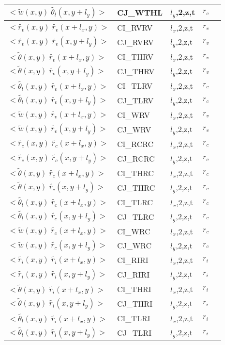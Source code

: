 \begin{center}
\begin{tabular}{||p{6cm}|>{\centering}p{2.5cm}|>{\centering}p{1.5cm}|>{\centering}p{0.5cm}|p{5cm }||}
\hline
$<\tilde{w}(x,y)\;\tilde{\theta_l}(x,y+l_y)>$ & CJ\_WTHL & $l_y$,2,z,t & $r_c$ & \\
\hline
$<\tilde{r_v}(x,y)\;\tilde{r_v}(x+l_x,y)>$ & CI\_RVRV & $l_x$,2,z,t & $r_v$ & \\
\hline
$<\tilde{r_v}(x,y)\;\tilde{r_v}(x,y+l_y)>$ & CJ\_RVRV & $l_y$,2,z,t & $r_v$ & \\
\hline
$<\tilde{\theta}(x,y)\;\tilde{r_v}(x+l_x,y)>$ & CI\_THRV & $l_x$,2,z,t & $r_v$ & \\
\hline
$<\tilde{\theta}(x,y)\;\tilde{r_v}(x,y+l_y)>$ & CJ\_THRV & $l_y$,2,z,t & $r_v$ & \\
\hline
$<\tilde{\theta_l}(x,y)\;\tilde{r_v}(x+l_x,y)>$ & CI\_TLRV & $l_x$,2,z,t & $r_c$ & \\
\hline
$<\tilde{\theta_l}(x,y)\;\tilde{r_v}(x,y+l_y)>$ & CJ\_TLRV & $l_y$,2,z,t & $r_c$ & \\
\hline
$<\tilde{w}(x,y)\;\tilde{r_v}(x+l_x,y)>$ & CI\_WRV & $l_x$,2,z,t & $r_v$ & \\
\hline
$<\tilde{w}(x,y)\;\tilde{r_v}(x,y+l_y)>$ & CJ\_WRV & $l_y$,2,z,t & $r_v$ & \\
\hline
$<\tilde{r_c}(x,y)\;\tilde{r_c}(x+l_x,y)>$ & CI\_RCRC & $l_x$,2,z,t & $r_c$ & \\
\hline
$<\tilde{r_c}(x,y)\;\tilde{r_c}(x,y+l_y)>$ & CJ\_RCRC & $l_y$,2,z,t & $r_c$ & \\
\hline
$<\tilde{\theta}(x,y)\;\tilde{r_c}(x+l_x,y)>$ & CI\_THRC & $l_x$,2,z,t & $r_c$ & \\
\hline
$<\tilde{\theta}(x,y)\;\tilde{r_c}(x,y+l_y)>$ & CJ\_THRC & $l_y$,2,z,t & $r_c$ & \\
\hline
$<\tilde{\theta_l}(x,y)\;\tilde{r_c}(x+l_x,y)>$ & CI\_TLRC & $l_x$,2,z,t & $r_c$ & \\
\hline
$<\tilde{\theta_l}(x,y)\;\tilde{r_c}(x,y+l_y)>$ & CJ\_TLRC & $l_y$,2,z,t & $r_c$ & \\
\hline
$<\tilde{w}(x,y)\;\tilde{r_c}(x+l_x,y)>$ & CI\_WRC & $l_x$,2,z,t & $r_c$ & \\
\hline
$<\tilde{w}(x,y)\;\tilde{r_c}(x,y+l_y)>$ & CJ\_WRC & $l_y$,2,z,t & $r_c$ & \\
\hline
$<\tilde{r_i}(x,y)\;\tilde{r_i}(x+l_x,y)>$ & CI\_RIRI & $l_x$,2,z,t & $r_i$ & \\
\hline
$<\tilde{r_i}(x,y)\;\tilde{r_i}(x,y+l_y)>$ & CJ\_RIRI & $l_y$,2,z,t & $r_i$ & \\
\hline
$<\tilde{\theta}(x,y)\;\tilde{r_i}(x+l_x,y)>$ & CI\_THRI & $l_x$,2,z,t & $r_i$ & \\
\hline
$<\tilde{\theta}(x,y)\;\tilde{r_i}(x,y+l_y)>$ & CJ\_THRI & $l_y$,2,z,t & $r_i$ & \\
\hline
$<\tilde{\theta_l}(x,y)\;\tilde{r_i}(x+l_x,y)>$ & CI\_TLRI & $l_x$,2,z,t & $r_i$ & \\
\hline
$<\tilde{\theta_l}(x,y)\;\tilde{r_i}(x,y+l_y)>$ & CJ\_TLRI & $l_y$,2,z,t & $r_i$ & \\
\hline
\hline
\end{tabular}
\end{center}
